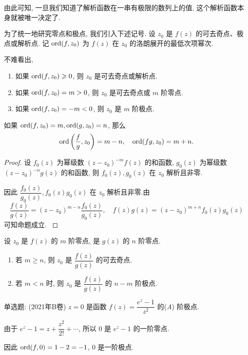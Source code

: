 \documentclass[nocolor,theme=doremi,lang=cn,11pt,chinese,twoside,openright,usesamecnt]{elegantbook}
\newenvironment{alertblock}[1]{\begin{tcolorbox}[alertstyle,title=#1]}{\end{tcolorbox}}
\newcommand\fillbrace[1]{{(\nolinebreak\hspace{0.5em minus 0.5em}\emph{#1}\hspace{0.5em minus 0.5em}\nolinebreak)}}
\begin{document}
由此可知, 一旦我们知道了解析函数在一串有极限的数列上的值, 这个解析函数本身就被唯一决定了.

为了统一地研究零点和极点, 我们引入下述记号.
设 $z_0$ 是 $f(z)$ 的可去奇点、极点或解析点.
记 ${\mathrm{ord}}(f,z_0)$ 为 $f(z)$ 在 $z_0$ 的洛朗展开的最低次项幂次.

不难看出,
\begin{enumerate}
	\item 如果 ${\mathrm{ord}}(f,z_0)\geqslant0$, 则 $z_0$ 是可去奇点或解析点.
	\item 如果 ${\mathrm{ord}}(f,z_0)=m>0$, 则 $z_0$ 是可去奇点或 $m$ 阶零点.
	\item 如果 ${\mathrm{ord}}(f,z_0)=-m<0$, 则 $z_0$ 是 $m$ 阶极点.
\end{enumerate}

\begin{alertblock}{可去奇点和极点判定方法}
	如果 ${\mathrm{ord}}(f,z_0)=m,{\mathrm{ord}}(g,z_0)=n$, 那么
	\[{\mathrm{ord}}\left(\frac fg,z_0\right)=m-n,\quad{\mathrm{ord}}(fg,z_0)=m+n.\]
\end{alertblock}

\begin{proof}
		设 $f_0(z)$ 为幂级数 $(z-z_0)^{-m}f(z)$ 的和函数, $g_0(z)$ 为幂级数 $(z-z_0)^{-n}g(z)$ 的和函数,
	{则 $f_0(z),g_0(z)$ 在 $z_0$ 解析且非零.
	}%

	{因此 $\dfrac{f_0(z)}{g_0(z)},f_0(z)g_0(z)$ 在 $z_0$ 解析且非零.由
		\[\frac{f(z)}{g(z)}=(z-z_0)^{m-n}\frac{f_0(z)}{g_0(z)},\quad
		f(z)g(z)=(z-z_0)^{m+n}f_0(z)g_0(z)\]
		可知命题成立.\qedhere
	}
\end{proof}

\begin{corollary}
	设 $z_0$ 是 $f(z)$ 的 $m$ 阶零点, 是 $g(z)$ 的 $n$ 阶零点.
	\begin{enumerate}
		\item 若 $m\ge n$, 则 $z_0$ 是 $\dfrac{f(z)}{g(z)}$ 的可去奇点.
		\item 若 $m<n$ 时, 则 $z_0$ 是 $\dfrac{f(z)}{g(z)}$ 的 $n-m$ 阶极点.
	\end{enumerate}
\end{corollary}

\begin{example}
	单选题: (2021年B卷) $z=0$ 是函数 $f(z)=\dfrac{e^z-1}{z^2}$ 的\fillbrace{{A}} 阶极点.
\end{example}

\begin{solution}
		由于 $e^z-1=z+\dfrac{z^2}{2!}+\cdots$, 所以 $0$ 是 $e^z-1$ 的一阶零点.

	{因此 ${\mathrm{ord}}(f,0)=1-2=-1$, $0$ 是一阶极点.
	}
\end{solution}
\end{document}
